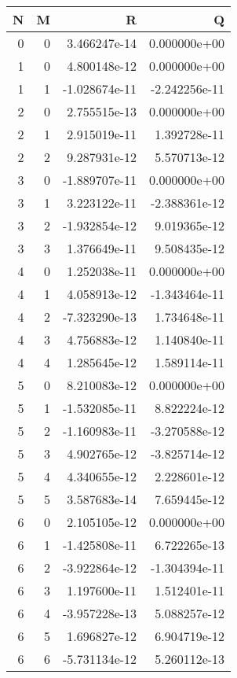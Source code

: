 \begin{tabular}{rrrr}
\toprule
   N &    M &             R &             Q \\
\midrule
   0 &    0 &  3.466247e-14 &  0.000000e+00 \\
   1 &    0 &  4.800148e-12 &  0.000000e+00 \\
   1 &    1 & -1.028674e-11 & -2.242256e-11 \\
   2 &    0 &  2.755515e-13 &  0.000000e+00 \\
   2 &    1 &  2.915019e-11 &  1.392728e-11 \\
   2 &    2 &  9.287931e-12 &  5.570713e-12 \\
   3 &    0 & -1.889707e-11 &  0.000000e+00 \\
   3 &    1 &  3.223122e-11 & -2.388361e-12 \\
   3 &    2 & -1.932854e-12 &  9.019365e-12 \\
   3 &    3 &  1.376649e-11 &  9.508435e-12 \\
   4 &    0 &  1.252038e-11 &  0.000000e+00 \\
   4 &    1 &  4.058913e-12 & -1.343464e-11 \\
   4 &    2 & -7.323290e-13 &  1.734648e-11 \\
   4 &    3 &  4.756883e-12 &  1.140840e-11 \\
   4 &    4 &  1.285645e-12 &  1.589114e-11 \\
   5 &    0 &  8.210083e-12 &  0.000000e+00 \\
   5 &    1 & -1.532085e-11 &  8.822224e-12 \\
   5 &    2 & -1.160983e-11 & -3.270588e-12 \\
   5 &    3 &  4.902765e-12 & -3.825714e-12 \\
   5 &    4 &  4.340655e-12 &  2.228601e-12 \\
   5 &    5 &  3.587683e-14 &  7.659445e-12 \\
   6 &    0 &  2.105105e-12 &  0.000000e+00 \\
   6 &    1 & -1.425808e-11 &  6.722265e-13 \\
   6 &    2 & -3.922864e-12 & -1.304394e-11 \\
   6 &    3 &  1.197600e-11 &  1.512401e-11 \\
   6 &    4 & -3.957228e-13 &  5.088257e-12 \\
   6 &    5 &  1.696827e-12 &  6.904719e-12 \\
   6 &    6 & -5.731134e-12 &  5.260112e-13 \\

\end{tabular}
